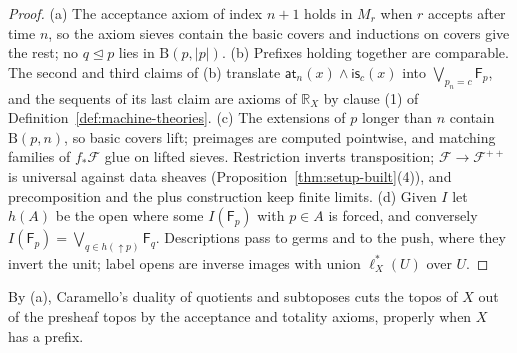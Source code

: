 \documentclass{lmcs}
\theoremstyle{definition}
\theoremstyle{remark}
\newcommand{\dimn}[1]{\lvert #1\rvert}
\newcommand{\ext}{\trianglelefteq}
\newcommand{\BB}{\mathrm{B}}
\newcommand{\upc}[1]{{\uparrow}#1}
\newcommand{\RX}[1]{\mathbb{R}_{#1}}
\newcommand{\fat}[1]{\mathsf{F}_{#1}}
\newcommand{\nm}[1]{\mathsf{is}_{#1}}
\providecommand{\lst}[1]{\ell^{*}_{#1}}
\providecommand{\fsh}{f_{\ast}}
\begin{document}
\begin{proof}
(a) The acceptance axiom of index $n+1$ holds in $M_r$ when $r$ accepts after time $n$, so the axiom sieves
contain the basic covers and inductions on covers give the rest;
no $q\ext p$ lies in $\BB(p,\dimn{p})$.
(b) Prefixes holding together are comparable. The second and
third claims of (b) translate $\mathsf{at}_n(x)\wedge\nm{c}(x)$ into
$\bigvee_{p_n=c}\fat{p}$,
and the sequents of its last claim are axioms of $\RX{X}$ by clause (1) of
Definition~\ref{def:machine-theories}.
(c) The extensions of $p$ longer than $n$ contain $\BB(p,n)$, so basic covers
lift; preimages are computed
pointwise, and matching families of $\fsh\mathscr{F}$ glue on
lifted sieves. Restriction inverts
transposition;
$\mathscr{F}\to\mathscr{F}^{++}$ is universal against data sheaves (Proposition~\ref{thm:setup-built}(4)), and
precomposition and the plus construction keep finite
limits.
(d) Given $I$ let $h(A)$ be the open where some $I(\fat{p})$ with $p\in A$ is forced, and conversely
$I(\fat{p})=\bigvee_{q\in h(\upc{p})}\fat{q}$.
Descriptions pass to germs and to the push, where they invert the
unit;
label opens are inverse images with union $\lst{X}(U)$ over
$U$.
\end{proof}

By (a), Caramello's duality of quotients and subtoposes
\cite{Caramello09,CL25a}
cuts the topos of $X$ out of the presheaf topos by the acceptance and totality axioms,
properly when $X$ has a prefix.
\end{document}
